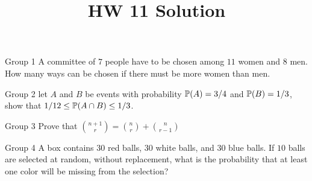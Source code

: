 \documentclass{article}
\title{HW 11 Solution}
\author{}
\date{}
\begin{document}
\maketitle

\iffalse
\begin{problem}
    {Group 1}
    A committee of $7$ people have to be chosen among $11$ women and $8$ men. How many ways can be chosen if there must be more women than men.
\end{problem}

\begin{problem}
    {Group 2}
    let $A$ and $B$ be events with probability $\P{A}=3/4$ and $\P{B}=1/3$, show that $1/12\leq \P{A\cap B}\leq 1/3$.
\end{problem}

\begin{problem}
    {Group 3}
    Prove that $\binom{n+1}{r}=\binom{n}{r}+\binom{n}{r-1}$
\end{problem}

\begin{problem}
    {Group 4}
    A box contains $30$ red balls, $30$ white balls, and $30$ blue balls. If $10$ balls are selected at random, without replacement, what is the probability that at least one color will be missing from the selection?
\end{problem}
\end{document}
